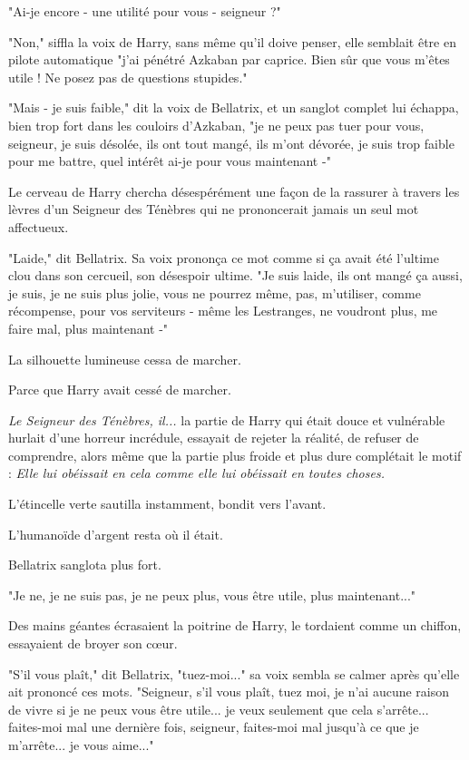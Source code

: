 "Ai-je encore - une utilité pour vous - seigneur ?"

"Non," siffla la voix de Harry, sans même qu'il doive penser, elle semblait être en pilote automatique "j'ai pénétré Azkaban par caprice. Bien sûr que vous m'êtes utile ! Ne posez pas de questions stupides."

"Mais - je suis faible," dit la voix de Bellatrix, et un sanglot complet lui échappa, bien trop fort dans les couloirs d'Azkaban, "je ne peux pas tuer pour vous, seigneur, je suis désolée, ils ont tout mangé, ils m'ont dévorée, je suis trop faible pour me battre, quel intérêt ai-je pour vous maintenant -"

Le cerveau de Harry chercha désespérément une façon de la rassurer à travers les lèvres d'un Seigneur des Ténèbres qui ne prononcerait jamais un seul mot affectueux.

"Laide," dit Bellatrix. Sa voix prononça ce mot comme si ça avait été l'ultime clou dans son cercueil, son désespoir ultime. "Je suis laide, ils ont mangé ça aussi, je suis, je ne suis plus jolie, vous ne pourrez même, pas, m'utiliser, comme récompense, pour vos serviteurs - même les Lestranges, ne voudront plus, me faire mal, plus maintenant -"

La silhouette lumineuse cessa de marcher.

Parce que Harry avait cessé de marcher.

\emph{Le Seigneur des Ténèbres, il...}  la partie de Harry qui était douce et vulnérable hurlait d'une horreur incrédule, essayait de rejeter la réalité, de refuser de comprendre, alors même que la partie plus froide et plus dure complétait le motif : \emph{Elle lui obéissait en cela comme elle lui obéissait en toutes choses.} 

L'étincelle verte sautilla instamment, bondit vers l'avant.

L'humanoïde d'argent resta où il était.

Bellatrix sanglota plus fort.

"Je ne, je ne suis pas, je ne peux plus, vous être utile, plus maintenant..."

Des mains géantes écrasaient la poitrine de Harry, le tordaient comme un chiffon, essayaient de broyer son cœur.

"S'il vous plaît," dit Bellatrix, "tuez-moi..." sa voix sembla se calmer après qu'elle ait prononcé ces mots. "Seigneur, s'il vous plaît, tuez moi, je n'ai aucune raison de vivre si je ne peux vous être utile... je veux seulement que cela s'arrête... faites-moi mal une dernière fois, seigneur, faites-moi mal jusqu'à ce que je m'arrête... je vous aime..."

